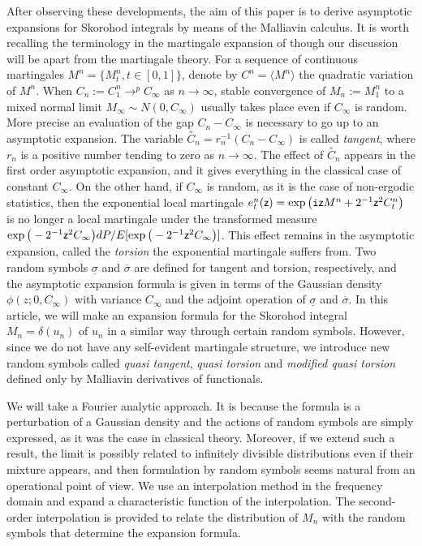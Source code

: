 \documentclass[a4paper]{article}
\numberwithin{equation}{section}
\def\tti{{\tt i}}
\newcommand{\sfz}{{\sf z}}
\def\dotc{\stackrel{\circ}{C}}
\begin{document}
After observing these developments, the aim of this paper is to derive asymptotic expansions
for Skorohod integrals by means of the Malliavin calculus. 
It is worth recalling the  terminology in the martingale expansion of \cite{yoshida2013martingale} 
though our discussion will be apart from the martingale theory.  
For a sequence of continuous martingales $M^n=\{M^n_t, t\in[0,1]\}$, 
denote by $C^n=\langle M^n\rangle$ the quadratic variation of $M^n$. %
When $C_n:=C^n_1\to^pC_\infty$ as $n\to\infty$, stable convergence of $M_n:=M^n_1$ to 
a mixed normal limit $M_\infty\sim N(0,C_\infty)$ 
usually takes place even if $C_\infty$ is random. 
More precise an evaluation of the gap $C_n-C_\infty$ is necessary to go up to an asymptotic expansion. 
The variable $\dotc_n=r_n^{-1}(C_n-C_\infty)$ is called {\it tangent}, where  
$r_n$ is a positive number tending to zero as $n\to\infty$. 
The effect of $\dotc_n$ appears in the first order asymptotic expansion,
and it gives everything in the classical case of constant $C_\infty$. 
On the other hand, if $C_\infty$ is random, as it is the case of non-ergodic statistics, then 
the exponential local martingale $e^n_t(\sfz)=\exp\big(\tti\sfz M^n+2^{-1}\sfz^2C^n_t\big)$ 
is no longer a local martingale under the transformed measure $\exp\big(-2^{-1}\sfz^2C_\infty\big)dP/E[\exp\big(-2^{-1}\sfz^2C_\infty\big)]$. 
This effect remains in the asymptotic expansion, called the {\it torsion} the exponential martingale suffers from. 
Two random symbols $\underline{\sigma}$ and $\overline{\sigma}$ are defined 
for tangent and torsion, respectively, and 
the asymptotic expansion formula is given in terms of the Gaussian density $\phi(z;0,C_\infty)$ 
with variance $C_\infty$ and the adjoint operation of $\underline{\sigma}$ and $\overline{\sigma}$. 
In this article, we will make an expansion formula for 
the Skorohod integral $M_n=\delta(u_n)$ of $u_n$ in a similar way through certain random symbols. 
However, since we do not have any self-evident martingale structure, 
we introduce new random symbols called {\it quasi tangent}, {\it quasi torsion} and {\it modified quasi torsion} 
defined only by Malliavin derivatives of functionals. 

We will take a Fourier analytic approach. 
It is because the formula is a perturbation of a Gaussian density and the actions of random symbols are 
simply expressed, as it was the case in classical theory. 
Moreover, if we extend such a result, 
the limit is possibly related to infinitely divisible distributions even if their mixture appears, and then  
formulation by random symbols seems natural from an operational point of view. 
We use an interpolation method in the frequency domain 
and 
expand a characteristic function of the interpolation. 
The second-order interpolation is provided to relate the distribution of $M_n$ with the random symbols 
that determine the expansion formula. 
\end{document}
